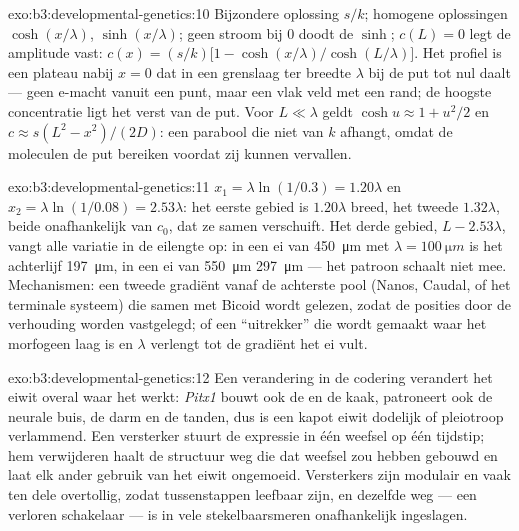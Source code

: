 \begin{solution}{exo:b3:developmental-genetics:10}
Bijzondere oplossing $s/k$; homogene oplossingen $\cosh(x/\lambda)$,
$\sinh(x/\lambda)$; geen stroom bij $0$ doodt de $\sinh$; $c(L) = 0$
legt de amplitude vast: $c(x) = (s/k)\bigl[1 - \cosh(x/\lambda)/\cosh(L/\lambda)\bigr]$.
Het profiel is een plateau nabij $x = 0$ dat in een grenslaag ter
breedte $\lambda$ bij de put tot nul daalt --- geen e-macht vanuit een
punt, maar een vlak veld met een rand; de hoogste concentratie ligt het
verst van de put. Voor $L \ll \lambda$ geldt $\cosh u \approx 1 +
u^{2}/2$ en $c \approx s(L^{2} - x^{2})/(2D)$: een parabool die niet van
$k$ afhangt, omdat de moleculen de put bereiken voordat zij kunnen
vervallen.
\end{solution}

\begin{solution}{exo:b3:developmental-genetics:11}
$x_{1} = \lambda\ln(1/0.3) = 1.20\lambda$ en $x_{2} = \lambda\ln(1/0.08)
= 2.53\lambda$: het eerste gebied is $1.20\lambda$ breed, het tweede
$1.32\lambda$, beide onafhankelijk van $c_{0}$, dat ze samen
verschuift. Het derde gebied, $L - 2.53\lambda$, vangt alle variatie in
de eilengte op: in een ei van \qty{450}{\micro m} met
$\lambda = \qty{100}{\micro m}$ is het achterlijf \qty{197}{\micro m},
in een ei van \qty{550}{\micro m} \qty{297}{\micro m} --- het patroon
schaalt niet mee. Mechanismen: een tweede gradiënt vanaf de achterste
pool (Nanos, Caudal, of het terminale systeem) die samen met Bicoid
wordt gelezen, zodat de posities door de verhouding worden vastgelegd;
of een ``uitrekker'' die wordt gemaakt waar het morfogeen laag is en
$\lambda$ verlengt tot de gradiënt het ei vult.
\end{solution}

\begin{solution}{exo:b3:developmental-genetics:12}
Een verandering in de codering verandert het eiwit overal waar het
werkt: \emph{Pitx1} bouwt ook de  en de kaak, \emph{} patroneert ook de neurale buis, de darm en de tanden, dus is
een kapot eiwit dodelijk of pleiotroop verlammend. Een versterker
stuurt de expressie in één weefsel op één tijdstip; hem verwijderen
haalt de structuur weg die dat weefsel zou hebben gebouwd en laat elk
ander gebruik van het eiwit ongemoeid. Versterkers zijn modulair en
vaak ten dele overtollig, zodat tussenstappen leefbaar zijn, en
dezelfde weg --- een verloren schakelaar --- is in vele
stekelbaarsmeren onafhankelijk ingeslagen.
\end{solution}

